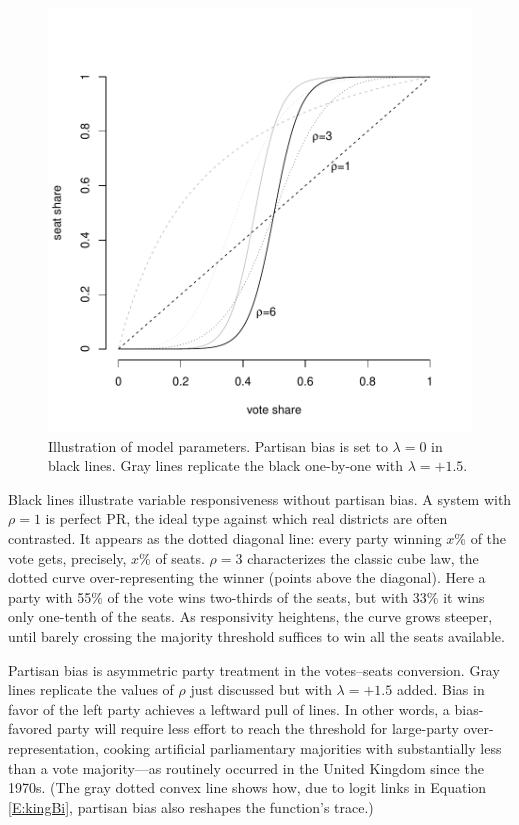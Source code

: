 \documentclass[letter,12pt]{article}
\begin{document}

\begin{figure}
\begin{center}
    \includegraphics[width=.55\columnwidth]{rhoExample.pdf} 
\caption{Illustration of model parameters. Partisan bias is set to $\lambda=0$ in black lines. Gray lines replicate the black one-by-one with $\lambda=+1.5$.}\label{F:lambdaRhoEx}
\end{center}
\end{figure}

Black lines illustrate variable responsiveness without partisan bias. A system with $\rho=1$ is perfect PR, the ideal type against which real districts are often contrasted. It appears as the dotted diagonal line: every party winning $x$\% of the vote gets, precisely, $x$\% of seats. $\rho=3$ characterizes the classic cube law, the dotted curve over-representing the winner (points above the diagonal). Here a party with 55\% of the vote wins two-thirds of the seats, but with 33\% it wins only one-tenth of the seats. As responsivity heightens, the curve grows steeper, until barely crossing the majority threshold suffices to win all the seats available. 

Partisan bias is asymmetric party treatment in the votes--seats conversion. Gray lines replicate the values of $\rho$ just discussed but with $\lambda = +1.5$ added. Bias in favor of the left party achieves a leftward pull of lines. In other words, a bias-favored party will require less effort to reach the threshold for large-party over-representation, cooking artificial parliamentary majorities with substantially less than a vote majority---as routinely occurred in the United Kingdom since the 1970s. (The gray dotted convex line shows how, due to logit links in Equation \ref{E:kingBi}, partisan bias also reshapes the function's trace.) %
\end{document}
